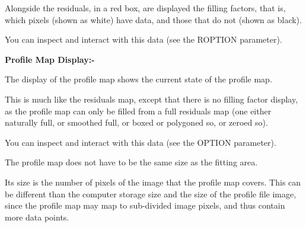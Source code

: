 \begin{small}
{{  Alongside the residuals, in a red box, are displayed the
  filling factors, that is, which pixels (shown as white) have data,
  and those that do not (shown as black).

  You can inspect and interact with this data (see the ROPTION parameter).

{\bf \hspace*{2em} Profile Map Display:-}

  The display of the profile map shows the current state of the
  profile map.

  This is much like the residuals map, except that there is no filling
  factor display, as the profile map can only be filled from a full
  residuals map (one either naturally full, or smoothed full, or boxed
  or polygoned so, or zeroed so).

  You can inspect and interact with this data (see the OPTION parameter).

  The profile map does not have to be the same size as the fitting
  area.

  Its size is the number of pixels of the image that the profile map
  covers. This can be different than the computer storage size and the
  size of the profile file image, since the profile map may map to
  sub-divided image pixels, and thus contain more data points.

}}
\end{small}
